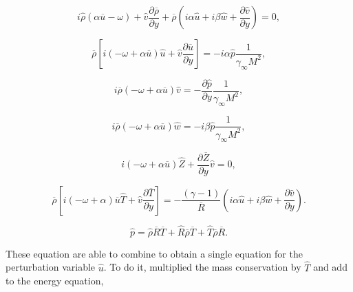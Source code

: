 \begin{equation}
i
\hat{\rho}
(\alpha\overline{u}- \omega) 
+
\hat{v}
\frac{\partial \overline{\rho}}{\partial y} 
+
\overline{\rho}
\left(
i
\alpha
\hat{u}
+
i
\beta
\hat{w}
+
\frac{\partial \hat{v}}{\partial y}
\right)
=
0
,
\end{equation} 


\begin{equation} 
\overline{\rho}
\left[
i
\left(
    -
\omega 
+
\alpha 
\overline{u}
\right)
\hat{u}
+
\hat{v}
\frac{\partial\overline{u}}{\partial y}
\right]
=
-
i
\alpha\hat{p}
\frac{1}{\gamma_{\infty} M^{2}}
,
\end{equation} 

\begin{equation} 
i
\overline{\rho}
\left(
-
\omega 
+
\alpha 
\overline{u}
\right)
\hat{v}
=
-
\frac{\partial \hat{p}}{\partial y}
\frac{1}{\gamma_{\infty} M^{2}}
,
\end{equation} 

\begin{equation} 
i
\overline{\rho}
\left(
-
\omega 
+
\alpha 
\overline{u}
\right)
\hat{w}
=
-
i
\beta\hat{p}
\frac{1}{\gamma_{\infty} M^{2}}
,
\end{equation} 

\begin{equation} 
i
\left(
-
\omega 
+
\alpha 
\overline{u}
\right)
\hat{Z}
+
\frac{\partial \overline{Z}}{\partial y}
\hat{v}
=
0
,
\end{equation} 

\begin{equation} 
\overline{\rho}
\left[
    i
    \left(
    -
    \omega 
    +
    \alpha 
    \right)
    \overline{u}
    \hat{T}
    +
    \hat{v}
    \frac{\partial \overline{T} }{\partial y}
\right]
=
-
\frac{(\gamma-1)}{\overline{R}}
\left(
i
\alpha
\hat{u}
+
i
\beta
\hat{w}
+
\frac{\partial \hat{v}}{\partial y}
\right)
.
\end{equation} 

\begin{equation*}
   \hat{p}
   = 
   \hat{\rho}
   \overline{R}
   \overline{T}
   +
   \hat{R}
   \overline{\rho}
   \overline{T}
   +
   \hat{T}
   \overline{\rho}
   \overline{R}
   .
\end{equation*}

These equation are able to combine to obtain a single equation 
for the perturbation variable $\hat{u}$. 
To do it,  multiplied the mass conservation by $\hat{T}$ and add  to the 
energy equation, 

